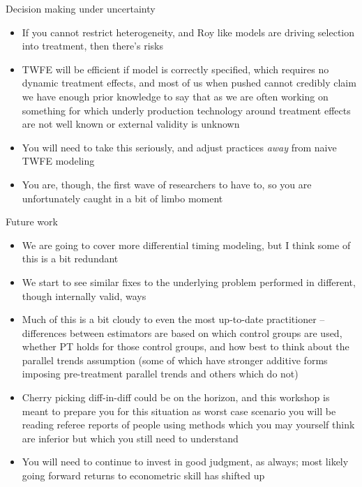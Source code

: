 \documentclass{beamer}
\begin{document}
\begin{frame}{Decision making under uncertainty}

\begin{itemize}

\item If you cannot restrict heterogeneity, and Roy like models are driving selection into treatment, then there's risks
\item TWFE will be efficient if model is correctly specified, which requires no dynamic treatment effects, and most of us when pushed cannot credibly claim we have enough prior knowledge to say that as we are often working on something for which underly production technology around treatment effects are not well known or external validity is unknown
\item You will need to take this seriously, and adjust practices \emph{away} from naive TWFE modeling
\item You are, though, the first wave of researchers to have to, so you are unfortunately caught in a bit of limbo moment
\end{itemize}

\end{frame}

\begin{frame}{Future work}

\begin{itemize}

\item We are going to cover more differential timing modeling, but I think some of this is a bit redundant
\item We start to see similar fixes to the underlying problem performed in different, though internally valid, ways
\item Much of this is a bit cloudy to even the most up-to-date practitioner -- differences between estimators are based on which control groups are used, whether PT holds for those control groups, and how best to think about the parallel trends assumption (some of which have stronger additive forms imposing pre-treatment parallel trends and others which do not)
\item Cherry picking diff-in-diff could be on the horizon, and this workshop is meant to prepare you for this situation as worst case scenario you will be reading referee reports of people using methods which you may yourself think are inferior but which you still need to understand
\item You will need to continue to invest in good judgment, as always; most likely going forward returns to econometric skill has shifted up
\end{itemize}

\end{frame}
\end{document}
